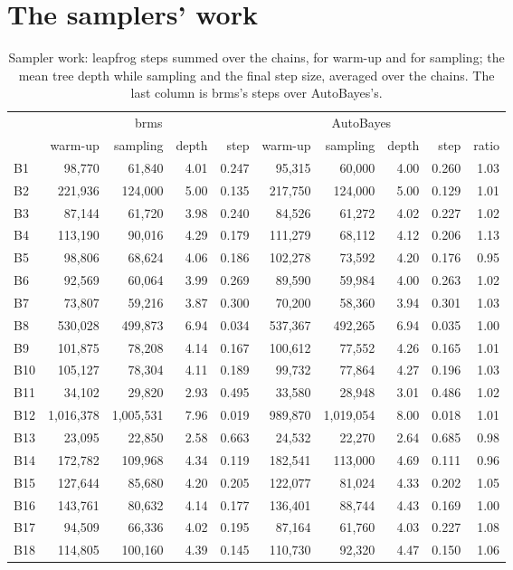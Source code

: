 \documentclass[11pt]{article}
\begin{document}
\section{The samplers' work}

\begin{table}[H]
\footnotesize
\setlength{\tabcolsep}{4pt}
\begin{center}
\begin{tabular}{@{}lrrrrrrrrr@{}}
\toprule
& \multicolumn{4}{c}{brms} & \multicolumn{4}{c}{AutoBayes} & \\
\cmidrule(lr){2-5}\cmidrule(lr){6-9}& warm-up & sampling & depth & step & warm-up & sampling & depth & step & ratio \\
\midrule
B1 & 98,770 & 61,840 & 4.01 & 0.247 & 95,315 & 60,000 & 4.00 & 0.260 & 1.03 \\
B2 & 221,936 & 124,000 & 5.00 & 0.135 & 217,750 & 124,000 & 5.00 & 0.129 & 1.01 \\
B3 & 87,144 & 61,720 & 3.98 & 0.240 & 84,526 & 61,272 & 4.02 & 0.227 & 1.02 \\
B4 & 113,190 & 90,016 & 4.29 & 0.179 & 111,279 & 68,112 & 4.12 & 0.206 & 1.13 \\
B5 & 98,806 & 68,624 & 4.06 & 0.186 & 102,278 & 73,592 & 4.20 & 0.176 & 0.95 \\
B6 & 92,569 & 60,064 & 3.99 & 0.269 & 89,590 & 59,984 & 4.00 & 0.263 & 1.02 \\
B7 & 73,807 & 59,216 & 3.87 & 0.300 & 70,200 & 58,360 & 3.94 & 0.301 & 1.03 \\
B8 & 530,028 & 499,873 & 6.94 & 0.034 & 537,367 & 492,265 & 6.94 & 0.035 & 1.00 \\
B9 & 101,875 & 78,208 & 4.14 & 0.167 & 100,612 & 77,552 & 4.26 & 0.165 & 1.01 \\
B10 & 105,127 & 78,304 & 4.11 & 0.189 & 99,732 & 77,864 & 4.27 & 0.196 & 1.03 \\
B11 & 34,102 & 29,820 & 2.93 & 0.495 & 33,580 & 28,948 & 3.01 & 0.486 & 1.02 \\
B12 & 1,016,378 & 1,005,531 & 7.96 & 0.019 & 989,870 & 1,019,054 & 8.00 & 0.018 & 1.01 \\
B13 & 23,095 & 22,850 & 2.58 & 0.663 & 24,532 & 22,270 & 2.64 & 0.685 & 0.98 \\
B14 & 172,782 & 109,968 & 4.34 & 0.119 & 182,541 & 113,000 & 4.69 & 0.111 & 0.96 \\
B15 & 127,644 & 85,680 & 4.20 & 0.205 & 122,077 & 81,024 & 4.33 & 0.202 & 1.05 \\
B16 & 143,761 & 80,632 & 4.14 & 0.177 & 136,401 & 88,744 & 4.43 & 0.169 & 1.00 \\
B17 & 94,509 & 66,336 & 4.02 & 0.195 & 87,164 & 61,760 & 4.03 & 0.227 & 1.08 \\
B18 & 114,805 & 100,160 & 4.39 & 0.145 & 110,730 & 92,320 & 4.47 & 0.150 & 1.06 \\
\bottomrule
\end{tabular}\end{center}
\caption{\small Sampler work: leapfrog steps summed over the chains, for warm-up and for sampling; the mean tree depth while sampling and the final step size, averaged over the chains. The last column is brms's steps over AutoBayes's.}\label{tab:work}
\end{table}
\end{document}

